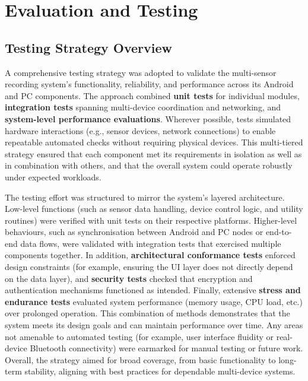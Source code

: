 \chapter{Evaluation and Testing}


\section{Testing Strategy Overview}
A comprehensive testing strategy was adopted to validate the multi-sensor recording system's functionality, reliability, and performance across its Android and PC components. The approach combined \textbf{unit tests} for individual modules, \textbf{integration tests} spanning multi-device coordination and networking, and \textbf{system-level performance evaluations}. Wherever possible, tests simulated hardware interactions (e.g., sensor devices, network connections) to enable repeatable automated checks without requiring physical devices. This multi-tiered strategy ensured that each component met its requirements in isolation as well as in combination with others, and that the overall system could operate robustly under expected workloads.

The testing effort was structured to mirror the system's layered architecture. Low-level functions (such as sensor data handling, device control logic, and utility routines) were verified with unit tests on their respective platforms. Higher-level behaviours, such as synchronisation between Android and PC nodes or end-to-end data flows, were validated with integration tests that exercised multiple components together. In addition, \textbf{architectural conformance tests} enforced design constraints (for example, ensuring the UI layer does not directly depend on the data layer), and \textbf{security tests} checked that encryption and authentication mechanisms functioned as intended. Finally, extensive \textbf{stress and endurance tests} evaluated system performance (memory usage, CPU load, etc.) over prolonged operation. This combination of methods demonstrates that the system meets its design goals and can maintain performance over time. Any areas not amenable to automated testing (for example, user interface fluidity or real-device Bluetooth connectivity) were earmarked for manual testing or future work. Overall, the strategy aimed for broad coverage, from basic functionality to long-term stability, aligning with best practices for dependable multi-device systems.


